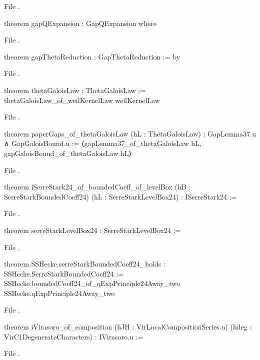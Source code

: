 \noindent File .
\begin{leancode}
theorem gapQExpansion : GapQExpansion where
\end{leancode}
\noindent File .
\begin{leancode}
theorem gapThetaReduction : GapThetaReduction := by
\end{leancode}
\noindent File .
\begin{leancode}
theorem thetaGaloisLaw : ThetaGaloisLaw := thetaGaloisLaw_of_weilKernelLaw weilKernelLaw
\end{leancode}
\noindent File .
\begin{leancode}
theorem paperGaps_of_thetaGaloisLaw (hL : ThetaGaloisLaw) :
    GapLemma37.{u} ∧ GapGaloisBound.{u} :=
  ⟨gapLemma37_of_thetaGaloisLaw hL, gapGaloisBound_of_thetaGaloisLaw hL⟩
\end{leancode}
\noindent File .
\begin{leancode}
theorem iSerreStark24_of_boundedCoeff_of_levelBox (hB : SerreStarkBoundedCoeff24)
    (hL : SerreStarkLevelBox24) : ISerreStark24 :=
\end{leancode}
\noindent File .
\begin{leancode}
theorem serreStarkLevelBox24 : SerreStarkLevelBox24 :=
\end{leancode}
\noindent File .
\begin{leancode}
theorem SSHecke.serreStarkBoundedCoeff24_holds : SSHecke.SerreStarkBoundedCoeff24 :=
  SSHecke.boundedCoeff24_of_qExpPrinciple24Away_two SSHecke.qExpPrinciple24Away_two
\end{leancode}
\noindent File .
\begin{leancode}
theorem iVirasoro_of_composition (hJH : VirLocalCompositionSeries.{u})
    (hdeg : VirC1DegenerateCharacters) : IVirasoro.{u} :=
\end{leancode}
\noindent File .
